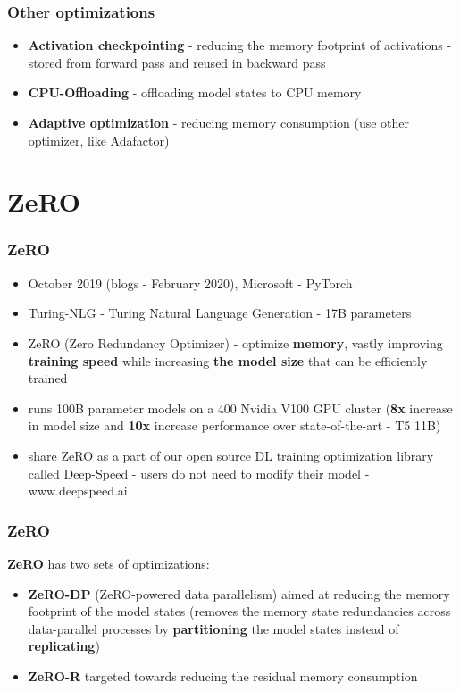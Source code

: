 \documentclass{beamer}
\begin{document}
\begin{frame}
    \frametitle{Other optimizations}
    \begin{itemize}
        \item \textbf{Activation checkpointing} - reducing the memory footprint of activations - stored from forward pass and reused in backward pass
        \item \textbf{CPU-Offloading} - offloading model states to CPU memory
        \item \textbf{Adaptive optimization} - reducing memory consumption (use other optimizer, like Adafactor)
    \end{itemize}
\end{frame}


\section{ZeRO}
\begin{frame}
    \frametitle{ZeRO \cite{zero}}
    \begin{itemize}
        \item October 2019 (blogs - February 2020), Microsoft - PyTorch
        \item Turing-NLG - Turing Natural Language Generation - 17B parameters
        \item ZeRO (Zero Redundancy Optimizer) - optimize \textbf{memory}, vastly improving \textbf{training speed} while increasing \textbf{the model size} that can be efficiently trained
        \item runs 100B parameter models on a 400 Nvidia V100 GPU cluster (\textbf{8x} increase in model size and \textbf{10x} increase performance over state-of-the-art - T5 11B)
        \item share ZeRO as a part of our open source DL training optimization library called Deep-Speed - users do not need to modify their model - www.deepspeed.ai
    \end{itemize}
\end{frame}

\begin{frame}
    \frametitle{ZeRO}
    \textbf{ZeRO} has two sets of optimizations:
    \begin{itemize}
        \item \textbf{ZeRO-DP} (ZeRO-powered data parallelism) aimed at reducing the memory footprint of the model states (removes the memory state redundancies across data-parallel processes by \textbf{partitioning} the model states instead of \textbf{replicating})
        \item \textbf{ZeRO-R} targeted towards reducing the residual memory consumption
    \end{itemize}
\end{frame}
\end{document}
